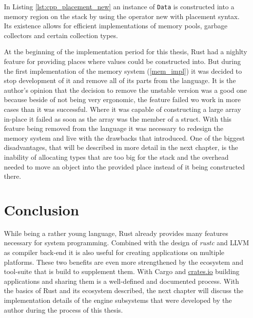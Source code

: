 In Listing \ref{lst:cpp_placement_new} an instance of \texttt{Data} is constructed into a memory region on the stack by using the operator new with placement syntax. Its existence allows for efficient implementations of memory pools, garbage collectors and certain collection types.

At the beginning of the implementation period for this thesis, Rust had a nighlty feature for providing places where values could be constructed into. But during the first implementation of the memory system (\ref{mem_impl}) it was decided to stop development of it and remove all of its parts from the language. It is the author's opinion that the decision to remove the unstable version was a good one because beside of not being very ergonomic, the feature failed wo work in more cases than it was successful. Where it was capable of constructing a large array in-place it failed as soon as the array was the member of a struct. With this feature being removed from the language it was necessary to redesign the memory system and live with the drawbacks that introduced. One of the biggest disadvantages, that will be described in more detail in the next chapter, is the inability of allocating types that are too big for the stack and the overhead needed to move an object into the provided place instead of it being constructed there.

\section{Conclusion}

While being a rather young language, Rust already provides many features necessary for system programming. Combined with the design of \textit{rustc} and \ac{LLVM} as compiler back-end it is also useful for creating applications on multiple platforms. These two benefits are even more strengthened by the ecosystem and tool-suite that is build to supplement them. With Cargo and \url{crates.io} building applications and sharing them is a well-defined and documented process. With the basics of Rust and its ecosystem described, the next chapter will discuss the implementation details of the engine subsystems that were developed by the author during the process of this thesis.

